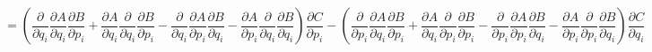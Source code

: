 \documentclass{article}
\begin{document}
\[  =  \left(\frac{\partial }{\partial q_{i}}\frac{\partial A}{\partial q_{i}} \frac{\partial B}{\partial p_{i}}
						+\frac{\partial A}{\partial q_{i}} \frac{\partial }{\partial q_{i}}\frac{\partial B}{\partial p_{i}} 
						-\frac{\partial }{\partial q_{i}}\frac{\partial A}{\partial p_{i}} \frac{\partial B}{\partial q_{i}}
						-\frac{\partial A}{\partial p_{i}} \frac{\partial }{\partial q_{i}}\frac{\partial B}{\partial q_{i}}\right) \frac{\partial C}{\partial p_{i}}  
		-	\left(\frac{\partial }{\partial p_{i}}\frac{\partial A}{\partial q_{i}} \frac{\partial B}{\partial p_{i}}
						+\frac{\partial A}{\partial q_{i}} \frac{\partial }{\partial p_{i}}\frac{\partial B}{\partial p_{i}} 
						-\frac{\partial }{\partial p_{i}}\frac{\partial A}{\partial p_{i}} \frac{\partial B}{\partial q_{i}}
						-\frac{\partial A}{\partial p_{i}} \frac{\partial }{\partial p_{i}}\frac{\partial B}{\partial q_{i}}\right) \frac{\partial C}{\partial q_{i}} \]
\end{document}
